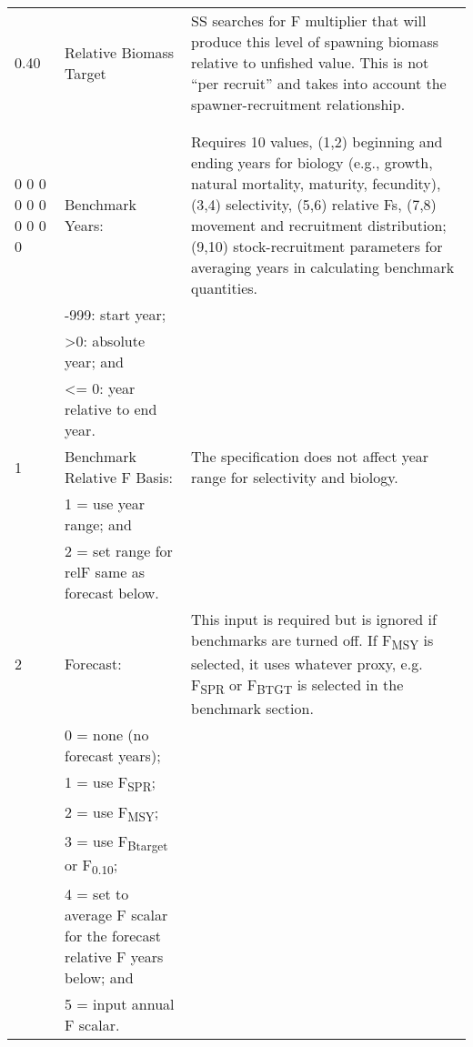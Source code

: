 \begin{landscape}
{\begin{longtable}{p{3.2cm} p{7cm} p{10.8cm}}
 \hline
 0.40 & Relative Biomass Target & \multirow{1}{1cm}[-0.25cm]{\parbox{11cm }{ SS searches for F multiplier that will produce this level of spawning biomass relative to unfished value.  This is not “per recruit” and takes into account the spawner-recruitment relationship.}} \Tstrut\\
      & & \Bstrut\\
      & & \Bstrut\\
  
 \hline
 0 0 0 0 0 0 0 0 0 0 & Benchmark Years: & \multirow{1}{1cm}[-0.25cm]{\parbox{11cm }{ Requires 10 values, (1,2) beginning and ending years for biology (e.g., growth, natural mortality, maturity, fecundity), (3,4) selectivity, (5,6) relative Fs, (7,8) movement and recruitment distribution; (9,10) stock-recruitment parameters for averaging years in calculating benchmark quantities.}} \Tstrut\\
  & -999: start year; & \\
  & >0:   absolute year; and & \\
  & <= 0: year relative to end year. & \\


  \pagebreak
  1 & Benchmark Relative F Basis: &  \multirow{1}{1cm}[-0.25cm]{\parbox{11cm }{ The specification does not affect year range for selectivity and biology.}} \Tstrut\\
    & 1 = use year range; and & \\
    & 2 = set range for relF same as forecast below. & \\
    
  \hline
  2 & Forecast: & \multirow{1}{1cm}[-0.25cm]{\parbox{11cm }{ This input is required but is ignored if benchmarks are turned off.  If F\textsubscript{MSY} is selected, it uses whatever proxy, e.g. F\textsubscript{SPR} or F\textsubscript{BTGT} is selected in the benchmark section.}} \Tstrut\\
    & 0 = none (no forecast years); & \\
    & 1 = use F\textsubscript{SPR}; & \\
    & 2 = use F\textsubscript{MSY}; & \\
    & 3 = use F\textsubscript{Btarget} or F\textsubscript{0.10}; & \\
    & 4 = set to average F scalar for the forecast relative F years below; and & \\
    & 5 = input annual F scalar. & \Bstrut\\
    

\end{longtable}}
\end{landscape}
